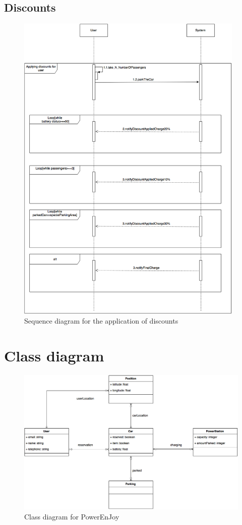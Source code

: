 \subsection{Discounts}
\begin{figure}[h]
\centering
\includegraphics[height=15.2cm,keepaspectratio]{figures/sequence_discounts.eps}
\caption{Sequence diagram for the application of discounts}
\label{fig:sequence_discounts}
\end{figure}

\newpage
\section{Class diagram}
\begin{figure}[h]
	\centering
	\includegraphics[width=\textwidth,keepaspectratio]{figures/class_diagram.eps}
	\caption{Class diagram for PowerEnJoy}
	\label{fig:class_diagram}
\end{figure}


